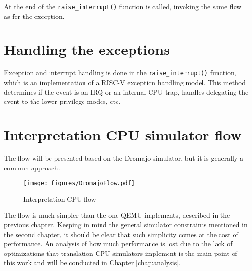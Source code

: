 \noindent
At the end of the \texttt{raise\_interrupt()} function is called, invoking the same flow as for the exception.

\section*{Handling the exceptions}

Exception and interrupt handling is done in the \texttt{raise\_interrupt()} function, which is an implementation of
a RISC-V exception handling model. This method determines if the event is an IRQ or an internal CPU trap, handles
delegating the event to the lower privilege modes, etc.

\pagebreak

\section{Interpretation CPU simulator flow}

The flow will be presented based on the Dromajo simulator, but it is generally a common approach.

\begin{figure}[h]
	\centering
	\texttt{[image: figures/DromajoFlow.pdf]}
	\caption{Interpretation CPU flow}
\end{figure}

\noindent
The flow is much simpler than the one QEMU implements, described in the previous chapter. Keeping in mind the general
simulator constraints mentioned in the second chapter, it should be clear that such simplicity comes at the cost of
performance. An analysis of how much performance is lost due to the lack of optimizations that translation CPU simulators
implement is the main point of this work and will be conducted in Chapter \ref{chap:analysis}.